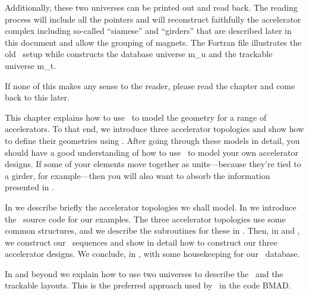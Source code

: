{{{Additionally, these two universes can be printed out and read
back. The reading process will include all the pointers and will
reconstruct faithfully the accelerator complex including so-called
``siamese'' and ``girders'' that are described later in this document
and allow the grouping of magnets. The Fortran file
 illustrates the old \DNA\ setup while
 constructs the database universe m_u and
the trackable universe m_t.
 
If none of this makes any sense to the reader, please read the chapter
and come back to this later. } }}

This chapter explains how to use \PTC\ to model the geometry for a
range of accelerators. To that end, we introduce three accelerator
topologies and show how to define their geometries using \PTC. After
going through these models in detail, you should have a good
understanding of how to use \PTC\ to model your own accelerator
designs. If some of your elements move together as units---because
they're tied to a girder, for example---then you will also want to
absorb the information presented in .

In  we describe briefly the accelerator topologies
we shall model. In  we introduce the \PTC\ source code
for our examples. The three accelerator topologies use some common
structures, and we describe the subroutines for these in
. Then, in  and ,
we construct our \DNA\ sequences and show in detail how to construct
our three accelerator designs. We conclude, in , with
some housekeeping
for our \DNA\ database.

In  and beyond we explain how to use two universes to describe the \DNA\ and the trackable layouts. This is the preferred approach used by  \PTC\ in the code BMAD.




